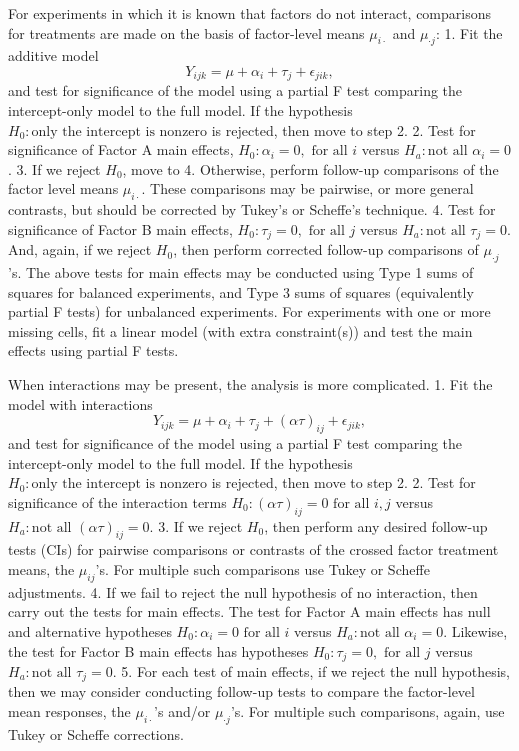 \documentclass[
]{book}
\begin{document}
For experiments in which it is known that factors do not interact, comparisons for treatments are made on the basis of factor-level means \(\mu_{i\cdot}\) and \(\mu_{\cdot j}\):
1. Fit the additive model
\[Y_{ijk} = \mu+\alpha_i +\tau_j + \epsilon_{jik},\]
and test for significance of the model using a partial F test comparing the intercept-only model to the full model. If the hypothesis \(H_0:\text{only the intercept is nonzero}\) is rejected, then move to step 2.
2. Test for significance of Factor A main effects, \(H_0:\alpha_i = 0, \text{ for all }i\) versus \(H_a:\text{not all }\alpha_i = 0\).
3. If we reject \(H_0\), move to 4. Otherwise, perform follow-up comparisons of the factor level means \(\mu_{i\cdot}\). These comparisons may be pairwise, or more general contrasts, but should be corrected by Tukey's or Scheff\textquotesingle e's technique.
4. Test for significance of Factor B main effects, \(H_0:\tau_j = 0, \text{ for all }j\) versus \(H_a:\text{not all }\tau_j = 0\). And, again, if we reject \(H_0\), then perform corrected follow-up comparisons of \(\mu_{\cdot j}\)'s.
The above tests for main effects may be conducted using Type 1 sums of squares for balanced experiments, and Type 3 sums of squares (equivalently partial F tests) for unbalanced experiments. For experiments with one or more missing cells, fit a linear model (with extra constraint(s)) and test the main effects using partial F tests.

When interactions may be present, the analysis is more complicated.
1. Fit the model with interactions
\[Y_{ijk} = \mu+\alpha_i +\tau_j + (\alpha\tau)_{ij} + \epsilon_{jik},\]
and test for significance of the model using a partial F test comparing the intercept-only model to the full model. If the hypothesis \(H_0:\text{only the intercept is nonzero}\) is rejected, then move to step 2.
2. Test for significance of the interaction terms \(H_0:(\alpha\tau)_{ij} = 0 \text{ for all }i,j\) versus \(H_a:\text{not all }(\alpha\tau)_{ij}=0\).
3. If we reject \(H_0\), then perform any desired follow-up tests (CIs) for pairwise comparisons or contrasts of the crossed factor treatment means, the \(\mu_{ij}\)'s. For multiple such comparisons use Tukey or Scheff\textquotesingle e adjustments.
4. If we fail to reject the null hypothesis of no interaction, then carry out the tests for main effects. The test for Factor A main effects has null and alternative hypotheses \(H_0:\alpha_i = 0 \text{ for all }i\) versus \(H_a:\text{not all }\alpha_i = 0\). Likewise, the test for Factor B main effects has hypotheses \(H_0:\tau_j = 0, \text{ for all }j\) versus \(H_a:\text{not all }\tau_j = 0\).
5. For each test of main effects, if we reject the null hypothesis, then we may consider conducting follow-up tests to compare the factor-level mean responses, the \(\mu_{i\cdot}\)'s and/or \(\mu_{\cdot j}\)'s. For multiple such comparisons, again, use Tukey or Scheff\textquotesingle e corrections.
\end{document}
